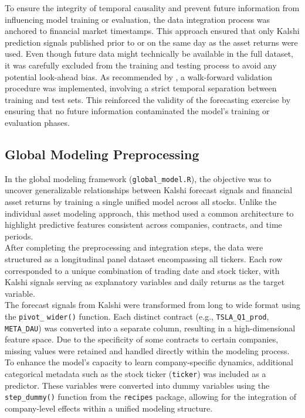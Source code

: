 \documentclass[12pt]{report}
\begin{document}
To ensure the integrity of temporal causality and prevent future information from influencing model training or evaluation, the data integration process was anchored to financial market timestamps. This approach ensured that only Kalshi prediction signals published prior to or on the same day as the asset returns were used. Even though future data might technically be available in the full dataset, it was carefully excluded from the training and testing process to avoid any potential look-ahead bias. As recommended by \cite{hyndman2018forecasting}, a walk-forward validation procedure was implemented, involving a strict temporal separation between training and test sets. This reinforced the validity of the forecasting exercise by ensuring that no future information contaminated the model's training or evaluation phases.



\newpage
\subsection{Global Modeling Preprocessing}
In the global modeling framework (\texttt{global\_model.R}), the objective was to uncover generalizable relationships between Kalshi forecast signals and financial asset returns by training a single unified model across all stocks. Unlike the individual asset modeling approach, this method used a common architecture to highlight predictive features consistent across companies, contracts, and time periods.\\

After completing the preprocessing and integration steps, the data were structured as a longitudinal panel dataset encompassing all tickers. Each row corresponded to a unique combination of trading date and stock ticker, with Kalshi signals serving as explanatory variables and daily returns as the target variable.\\

The forecast signals from Kalshi were transformed from long to wide format using the \texttt{pivot\_}
\texttt{wider()} function. Each distinct contract (e.g., \texttt{TSLA\_Q1\_prod}, \texttt{META\_DAU}) was converted into a separate column, resulting in a high-dimensional feature space. Due to the specificity of some contracts to certain companies, missing values were retained and handled directly within the modeling process.\\

To enhance the model's capacity to learn company-specific dynamics, additional categorical metadata such as the stock ticker (\texttt{ticker}) was included as a predictor. These variables were converted into dummy variables using the \texttt{step\_dummy()} function from the \texttt{recipes} package, allowing for the integration of company-level effects within a unified modeling structure.\\
\end{document}
